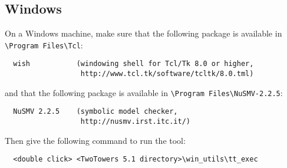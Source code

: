 \subsection{Windows}

On a Windows machine, make sure that the following package is available in \verb+\Program Files\Tcl+:

	\begin{verbatim}
  wish           (windowing shell for Tcl/Tk 8.0 or higher,
                  http://www.tcl.tk/software/tcltk/8.0.tml)
	\end{verbatim}

\noindent
and that the following package is available in \verb+\Program Files\NuSMV-2.2.5+:

	\begin{verbatim}
  NuSMV 2.2.5    (symbolic model checker,
                  http://nusmv.irst.itc.it/)
	\end{verbatim}

\noindent
Then give the following command to run the tool:

	\begin{verbatim}
  <double click> <TwoTowers 5.1 directory>\win_utils\tt_exec
	\end{verbatim}
